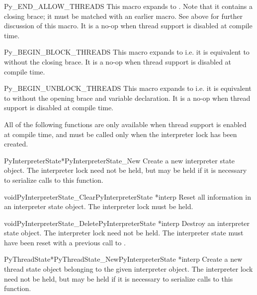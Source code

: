 \documentclass{manual}
\begin{document}
\begin{csimplemacrodesc}{Py_END_ALLOW_THREADS}
This macro expands to
.
Note that it contains a closing brace; it must be matched with an
earlier  macro.  See above for further
discussion of this macro.  It is a no-op when thread support is
disabled at compile time.
\end{csimplemacrodesc}

\begin{csimplemacrodesc}{Py_BEGIN_BLOCK_THREADS}
This macro expands to  i.e. it
is equivalent to  without the closing
brace.  It is a no-op when thread support is disabled at compile
time.
\end{csimplemacrodesc}

\begin{csimplemacrodesc}{Py_BEGIN_UNBLOCK_THREADS}
This macro expands to  i.e. it is
equivalent to  without the opening brace
and variable declaration.  It is a no-op when thread support is
disabled at compile time.
\end{csimplemacrodesc}

All of the following functions are only available when thread support
is enabled at compile time, and must be called only when the
interpreter lock has been created.

\begin{cfuncdesc}{PyInterpreterState*}{PyInterpreterState_New}{}
Create a new interpreter state object.  The interpreter lock need not
be held, but may be held if it is necessary to serialize calls to this
function.
\end{cfuncdesc}

\begin{cfuncdesc}{void}{PyInterpreterState_Clear}{PyInterpreterState *interp}
Reset all information in an interpreter state object.  The interpreter
lock must be held.
\end{cfuncdesc}

\begin{cfuncdesc}{void}{PyInterpreterState_Delete}{PyInterpreterState *interp}
Destroy an interpreter state object.  The interpreter lock need not be
held.  The interpreter state must have been reset with a previous
call to .
\end{cfuncdesc}

\begin{cfuncdesc}{PyThreadState*}{PyThreadState_New}{PyInterpreterState *interp}
Create a new thread state object belonging to the given interpreter
object.  The interpreter lock need not be held, but may be held if it
is necessary to serialize calls to this function.
\end{cfuncdesc}
\end{document}
